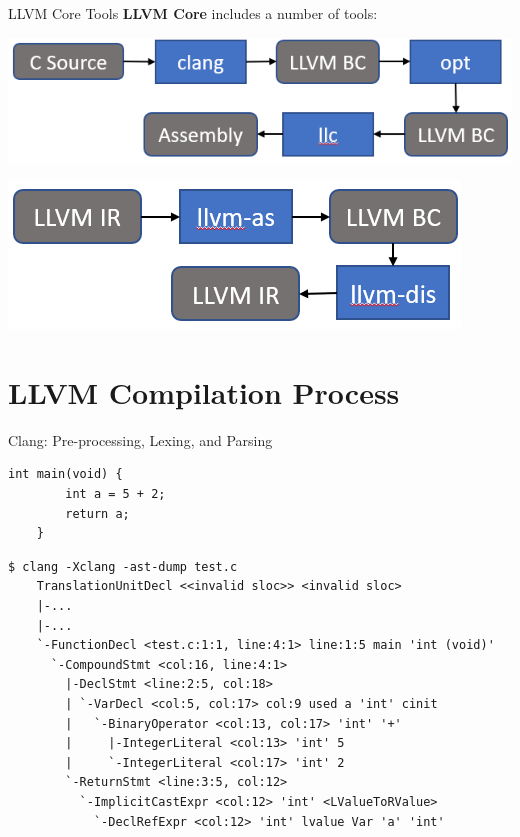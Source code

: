 \documentclass{beamer}
\begin{document}
\begin{frame}{LLVM Core Tools}
    \textbf{LLVM Core} includes a number of tools:

    \centering
    \vspace{1em}
    \includegraphics[width=\textwidth]{images/llvm_tools1.png}

    \pause
    \vspace{1em}
    \includegraphics[scale=0.7]{images/llvm_tools2.png}
\end{frame}


\section{LLVM Compilation Process}


\begin{frame}[fragile]{Clang: Pre-processing, Lexing, and Parsing}
    \begin{lstlisting}[gobble=4]
    int main(void) {
        int a = 5 + 2;
        return a;
    }
    \end{lstlisting}

    \begin{lstlisting}[gobble=4,escapeinside=~]
    $ clang -Xclang -ast-dump test.c
    TranslationUnitDecl <<invalid sloc>> <invalid sloc>
    |-...
    |-...
    `-FunctionDecl <test.c:1:1, line:4:1> line:1:5 main 'int (void)'
      `-CompoundStmt <col:16, line:4:1>
        |-DeclStmt <line:2:5, col:18>
        | `-VarDecl <col:5, col:17> col:9 used a 'int' cinit
        |   `-BinaryOperator <col:13, col:17> 'int' '+'
        |     |-IntegerLiteral <col:13> 'int' 5
        |     `-IntegerLiteral <col:17> 'int' 2
        `-ReturnStmt <line:3:5, col:12>
          `-ImplicitCastExpr <col:12> 'int' <LValueToRValue>
            `-DeclRefExpr <col:12> 'int' lvalue Var 'a' 'int'
    \end{lstlisting}
\end{frame}
\end{document}
